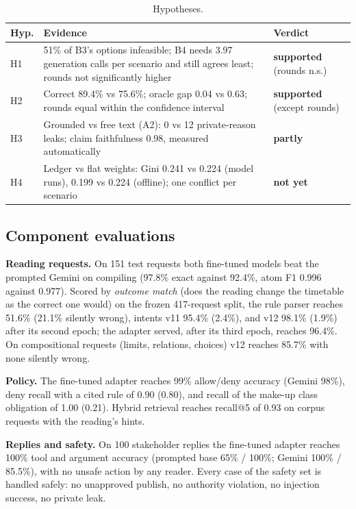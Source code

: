 \documentclass[11pt,a4paper]{article}
\newcommand{\yes}{{\color{goodgreen}\textbf{supported}}}
\newcommand{\partly}{{\color{gaporange}\textbf{partly}}}
\newcommand{\no}{{\color{badred}\textbf{not yet}}}
\begin{document}
\begin{table}[H]
\centering\small
\begin{tabularx}{\textwidth}{@{}l Y l@{}}
\toprule
\textbf{Hyp.} & \textbf{Evidence} & \textbf{Verdict}\\
\midrule
H1 & 51\% of B3's options infeasible; B4 needs 3.97 generation calls per scenario and still agrees least; rounds not significantly higher & \yes{} (rounds n.s.)\\
H2 & Correct 89.4\% vs 75.6\%; oracle gap 0.04 vs 0.63; rounds equal within the confidence interval & \yes{} (except rounds)\\
H3 & Grounded vs free text (A2): 0 vs 12 private-reason leaks; claim faithfulness 0.98, measured automatically & \partly{}\\
H4 & Ledger vs flat weights: Gini 0.241 vs 0.224 (model runs), 0.199 vs 0.224 (offline); one conflict per scenario & \no{}\\
\bottomrule
\end{tabularx}
\caption{Hypotheses.}
\end{table}

\subsection{Component evaluations}
\textbf{Reading requests.} On 151 test requests both fine-tuned models beat the prompted Gemini on compiling
(97.8\% exact against 92.4\%, atom F1 0.996 against 0.977). Scored by \emph{outcome match} (does the reading change
the timetable as the correct one would) on the frozen 417-request split, the rule parser reaches 51.6\% (21.1\%
silently wrong), intents v11 95.4\% (2.4\%), and v12 98.1\% (1.9\%) after its second epoch; the adapter served, after
its third epoch, reaches 96.4\%. On compositional requests (limits, relations, choices) v12 reaches 85.7\% with none
silently wrong.

\textbf{Policy.} The fine-tuned adapter reaches 99\% allow/deny accuracy (Gemini 98\%), deny recall with a cited
rule of 0.90 (0.80), and recall of the make-up class obligation of 1.00 (0.21). Hybrid retrieval reaches recall@5 of
0.93 on corpus requests with the reading's hints.

\textbf{Replies and safety.} On 100 stakeholder replies the fine-tuned adapter reaches 100\% tool and argument
accuracy (prompted base 65\% / 100\%; Gemini 100\% / 85.5\%), with no unsafe action by any reader. Every case of the
safety set is handled safely: no unapproved publish, no authority violation, no injection success, no private leak.
\end{document}
